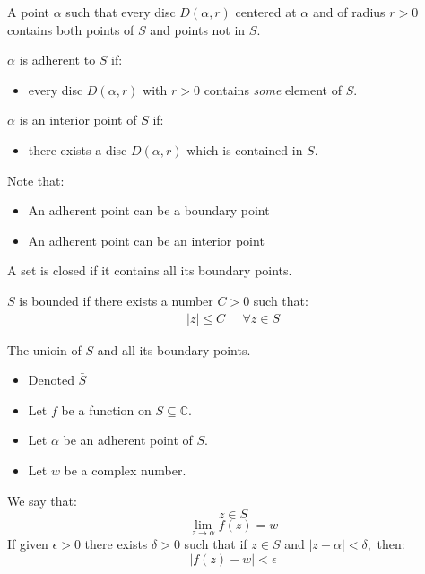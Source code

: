 \begin{defn}
	A point $\alpha$ such that every disc $D(\alpha, r)$ centered at $\alpha$ and of 
	radius $r > 0$ contains both points of $S$ and points not in $S.$
\end{defn}

\begin{defn}
	$\alpha$ is adherent to $S$ if: 
	\begin{itemize}
		\item every disc $D(\alpha, r)$ with $r > 0$ contains \textit{some} element of $S.$
	\end{itemize}
\end{defn}

\begin{defn}
	$\alpha$ is an interior point of $S$ if:
	\begin{itemize}
		\item there exists a disc $D(\alpha, r)$ which is contained in $S.$
	\end{itemize}
\end{defn}

Note that:
\begin{itemize}
	\item An adherent point can be a boundary point
	\item An adherent point can be an interior point
\end{itemize}

\begin{defn}
	A set is closed if it contains all its boundary points.
\end{defn}

\begin{defn}
	$S$ is bounded if there exists a number $C > 0$ such that:
	\begin{align*}
		|z| \leq C \;\;\;\;\; \forall z \in S
	\end{align*}
\end{defn}

\begin{defn}
	The unioin of $S$ and all its boundary points.
	\begin{itemize}
		\item Denoted $\bar{S}$
	\end{itemize}
\end{defn}

\begin{defn}
	
\end{defn}
\begin{itemize}
	\item Let $f$ be a function on $S \subseteq \mathbb{C}.$ 
	\item Let $\alpha$ be an adherent point of $S.$ 
	\item Let $w$ be a complex number. 
\end{itemize}
We say that:
	\[ z \in S \]
	\[ \lim_{z \to \alpha} f(z) = w \]
If given $\epsilon > 0$ there exists $\delta > 0$ such that if $z \in S$ and $|z - \alpha| < \delta,$ then:
\[ |f(z) - w | < \epsilon \]

